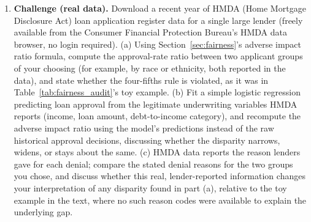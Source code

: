 \documentclass[../ai_in_finance]{subfiles}
\begin{document}
\begin{enumerate}[exercises]
    \item \textbf{Challenge (real data).} Download a recent year of HMDA (Home Mortgage Disclosure Act) loan application register data for a single large lender (freely available from the Consumer Financial Protection Bureau's HMDA data browser, no login required). (a) Using Section~\ref{sec:fairness}'s adverse impact ratio formula, compute the approval-rate ratio between two applicant groups of your choosing (for example, by race or ethnicity, both reported in the data), and state whether the four-fifths rule is violated, as it was in Table~\ref{tab:fairness_audit}'s toy example. (b) Fit a simple logistic regression predicting loan approval from the legitimate underwriting variables HMDA reports (income, loan amount, debt-to-income category), and recompute the adverse impact ratio using the model's predictions instead of the raw historical approval decisions, discussing whether the disparity narrows, widens, or stays about the same. (c) HMDA data reports the reason lenders gave for each denial; compare the stated denial reasons for the two groups you chose, and discuss whether this real, lender-reported information changes your interpretation of any disparity found in part (a), relative to the toy example in the text, where no such reason codes were available to explain the underlying gap.
\end{enumerate}

\end{document}
